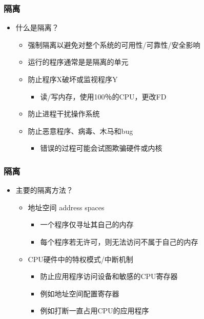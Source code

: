 \documentclass[UTF8]{ctexbeamer}
\begin{document}
\begin{frame}
	\frametitle{隔离}
	\begin{itemize}
		\item 什么是隔离？
		\begin{itemize}

		\item 强制隔离以避免对整个系统的可用性/可靠性/安全影响
		\item 运行的程序通常是是隔离的单元
		\item 防止程序X破坏或监视程序Y
			\begin{itemize}
			\item 读/写内存，使用100％的CPU，更改FD
			\end{itemize}
		\item 防止进程干扰操作系统
		\item 防止恶意程序、病毒、木马和bug
			\begin{itemize}
			\item 错误的过程可能会试图欺骗硬件或内核
			\end{itemize}
		\end{itemize}
	\end{itemize}
\end{frame}



\begin{frame}
	\frametitle{隔离}
	\begin{itemize}
		\item 主要的隔离方法？
		\begin{itemize}
			\item 地址空间 address spaces
				\begin{itemize}
				\item 一个程序仅寻址其自己的内存
				\item 每个程序若无许可，则无法访问不属于自己的内存
				\end{itemize}			
			
			\item CPU硬件中的特权模式/中断机制
				\begin{itemize}
				\item 防止应用程序访问设备和敏感的CPU寄存器
				\item 例如地址空间配置寄存器
				\item 例如打断一直占用CPU的应用程序
				\end{itemize}				
		\end{itemize}
	\end{itemize}
\end{frame}
\end{document}
